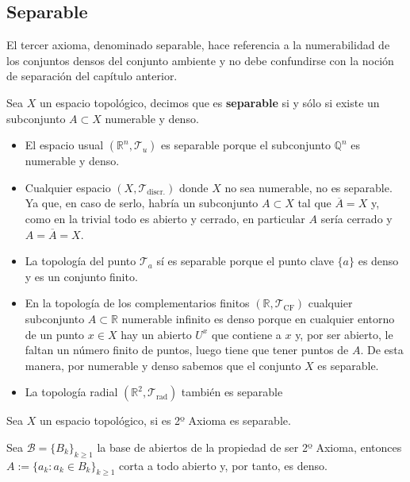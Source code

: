 \subsection{Separable}%
\label{sub:separable}
El tercer axioma, denominado separable, hace referencia a la numerabilidad de los conjuntos densos del conjunto ambiente y no debe confundirse con la noción de separación del capítulo anterior.

\begin{defi}[Separable]
Sea $X$ un espacio topológico, decimos que es \textbf{separable} si y sólo si existe un subconjunto $A\subset X$ numerable y denso.
\end{defi}

\begin{ej}
\begin{itemize}
    \item El espacio usual $\left( \mathbb{R}^n, \mathcal{T}_u \right)$ es separable porque el subconjunto $\mathbb{Q}^n$ es numerable y denso.
    \item Cualquier espacio $\left( X, \mathcal{T}_{\text{discr.}} \right)$ donde $X$ no sea numerable, no es separable. Ya que, en caso de serlo, habría un subconjunto $A\subset X$ tal que $\overline{A} = X$ y, como en la trivial todo es abierto y cerrado, en particular $A$ sería cerrado y $A = \overline{A} = X$.
    \item La topología del punto $\mathcal{T}_a$ sí es separable porque el punto clave $\{a\}$ es denso y es un conjunto finito.
    \item En la topología de los complementarios finitos $\left( \mathbb{R}, \mathcal{T}_{\text{CF}} \right)$ cualquier subconjunto $A\subset \mathbb{R}$ numerable infinito es denso porque en cualquier entorno de un punto $x\in X$ hay un abierto $U^x$ que contiene a $x$ y, por ser abierto, le faltan un número finito de puntos, luego tiene que tener puntos de $A$. De esta manera, por numerable y denso sabemos que el conjunto $X$ es separable.
    \item La topología radial $\left( \mathbb{R}^2, \mathcal{T}_{\text{rad}} \right)$ también es separable %
\end{itemize}
\end{ej}

\begin{prop}
Sea $X$ un espacio topológico, si es 2º Axioma es separable.
\end{prop}
\begin{demo}
Sea $\mathcal{B} = \{B_k\}_{k \ge 1}$ la base de abiertos de la propiedad de ser 2º Axioma, entonces $A := \{a_k : a_k \in B_k\}_{k \ge 1}$ corta a todo abierto y, por tanto, es denso.
\end{demo}

